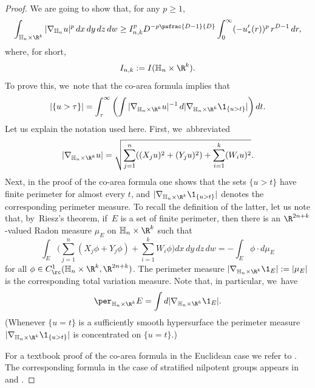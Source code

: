 \begin{proof}
We are going to show that, for any $p\geq 1$,
\begin{equation}
\label{eq:rearrangegrad}
\int_{\mathbb H_n\times\R^k} |\nabla_{\mathbb H_n} u|^p\,dx\,dy\,dz\,dw
\geq I_{n,k}^p D^{-p\psfrac{D-1}{D}} \int_0^\infty (-u_*'(r))^p\,r^{D-1}\,dr,
\end{equation}
where, for short,
\[
I_{n,k}:=I(\mathbb H_n\times\R^k).
\]
To prove this, we~note that the co-area formula implies that
\begin{equation}
\label{eq:coarea}
|\{ u>\tau\}| = \int_\tau^\infty \left(\int |\nabla_{\mathbb H_n\times\R^k} u|^{-1} \,d|\nabla_{\mathbb H_n\times\R^k}\1_{\{u>t\}}|\right) dt.
\end{equation}
Let us explain the notation used here. First, we~abbreviated
\[
|\nabla_{\mathbb H_n\times\R^k} u| = \sqrt{ \sum_{j=1}^n ((X_j u)^2 + (Y_j u)^2) + \sum_{i=1}^k (W_i u)^2 }.
\]
Next, in the proof of the co-area formula one shows that the sets $\{ u> t\}$ have finite perimeter for almost every $t$, and $|\nabla_{\mathbb H_n\times\R^k}\1_{\{u>t\}}|$ denotes the corresponding perimeter measure. To recall the definition of the latter, let us note that, by~Riesz's theorem, if~$E$ is a set of finite perimeter, then there is an $\R^{2n+k}$-valued Radon measure $\mu_E$ on $\mathbb H_n\times\R^k$ such that
\[
\int_E \biggl(\sum_{j=1}^n (X_j\phi+Y_j\phi) + \sum_{i=1}^k W_i\phi\biggr) dx\,dy\,dz\,dw = - \int_E \phi\cdot d\mu_E
\]
for all $\phi\in C^1_\rc(\mathbb H_n\times\R^k,\R^{2n+k})$. The perimeter measure $|\nabla_{\mathbb H_n\times\R^k} \1_E|:= |\mu_E|$ is the corresponding total variation measure. Note that, in particular, we~have
\[
\per_{\mathbb H_n\times\R^k} E = \int d|\nabla_{\mathbb H_n\times\R^k}\1_E|.
\]
(Whenever $\{u=t\}$ is a sufficiently smooth hypersurface the perimeter measure $|\nabla_{\mathbb H_n\times\R^k}\1_{\{u>t\}}|$ is concentrated on $\{u=t\}$.)

For a textbook proof of the co-area formula in the Euclidean case we refer to \cite[Th.\,13.1]{Ma}. The corresponding formula in the case of stratified nilpotent groups appears in \cite[Th.\,5.2]{GaNh} and \cite[Cor.\,2.3.5]{FrSeSC}.


\end{proof}
